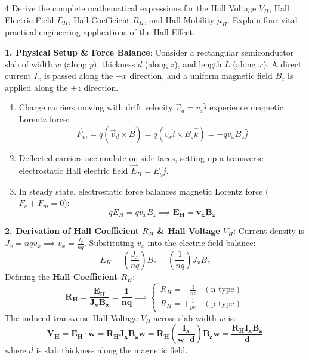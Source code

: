 \begin{theoryq}{4}
Derive the complete mathematical expressions for the Hall Voltage $V_H$, Hall Electric Field $E_H$, Hall Coefficient $R_H$, and Hall Mobility $\mu_H$. Explain four vital practical engineering applications of the Hall Effect.
\end{theoryq}
\begin{theorysol}
\textbf{1. Physical Setup \& Force Balance}:
Consider a rectangular semiconductor slab of width $w$ (along $y$), thickness $d$ (along $z$), and length $L$ (along $x$).
A direct current $I_x$ is passed along the $+x$ direction, and a uniform magnetic field $B_z$ is applied along the $+z$ direction.
\begin{enumerate}
    \item Charge carriers moving with drift velocity $\vec{v}_d = v_x \hat{i}$ experience magnetic Lorentz force:
    \begin{equation}
    \vec{F}_m = q (\vec{v}_d \times \vec{B}) = q (v_x \hat{i} \times B_z \hat{k}) = -q v_x B_z \hat{j}
    \end{equation}
    \item Deflected carriers accumulate on side faces, setting up a transverse electrostatic Hall electric field $\vec{E}_H = E_y \hat{j}$.
    \item In steady state, electrostatic force balances magnetic Lorentz force ($F_e + F_m = 0$):
    \begin{equation}
    q E_H = q v_x B_z \implies \mathbf{E_H = v_x B_z}
    \end{equation}
\end{enumerate}

\textbf{2. Derivation of Hall Coefficient $R_H$ \& Hall Voltage $V_H$}:
Current density is $J_x = n q v_x \implies v_x = \frac{J_x}{n q}$.
Substituting $v_x$ into the electric field balance:
\begin{equation}
E_H = \left(\frac{J_x}{n q}\right) B_z = \left(\frac{1}{n q}\right) J_x B_z
\end{equation}
Defining the \textbf{Hall Coefficient $R_H$}:
\begin{equation}
\mathbf{R_H = \frac{E_H}{J_x B_z} = \frac{1}{n q}} \implies \begin{cases} R_H = -\frac{1}{n e} & (\text{n-type}) \\ R_H = +\frac{1}{p e} & (\text{p-type}) \end{cases}
\end{equation}
The induced transverse Hall Voltage $V_H$ across slab width $w$ is:
\begin{equation}
\mathbf{V_H = E_H \cdot w = R_H J_x B_z w = R_H \left(\frac{I_x}{w \cdot d}\right) B_z w = \frac{R_H I_x B_z}{d}}
\end{equation}
where $d$ is slab thickness along the magnetic field.


\end{theorysol}
